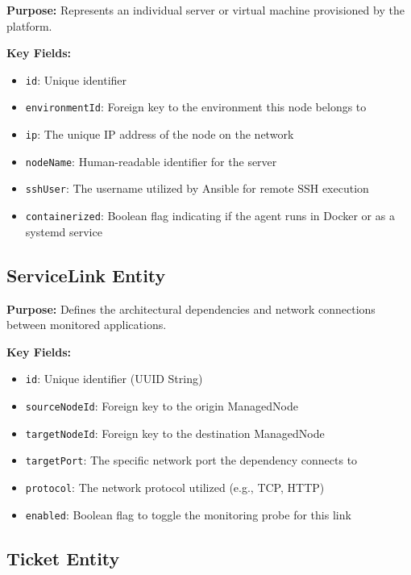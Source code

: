 \documentclass[12pt,a4paper]{report}
\begin{document}
\begin{tcolorbox}
  \textbf{Purpose:} Represents an individual server or virtual machine provisioned by the platform.
  
  \textbf{Key Fields:}
  \begin{itemize}
    \item \texttt{id}: Unique identifier
    \item \texttt{environmentId}: Foreign key to the environment this node belongs to
    \item \texttt{ip}: The unique IP address of the node on the network
    \item \texttt{nodeName}: Human-readable identifier for the server
    \item \texttt{sshUser}: The username utilized by Ansible for remote SSH execution
    \item \texttt{containerized}: Boolean flag indicating if the agent runs in Docker or as a systemd service
  \end{itemize}
\end{tcolorbox}

\subsection{ServiceLink Entity}

\begin{tcolorbox}
  \textbf{Purpose:} Defines the architectural dependencies and network connections between monitored applications.
  
  \textbf{Key Fields:}
  \begin{itemize}
    \item \texttt{id}: Unique identifier (UUID String)
    \item \texttt{sourceNodeId}: Foreign key to the origin ManagedNode
    \item \texttt{targetNodeId}: Foreign key to the destination ManagedNode
    \item \texttt{targetPort}: The specific network port the dependency connects to
    \item \texttt{protocol}: The network protocol utilized (e.g., TCP, HTTP)
    \item \texttt{enabled}: Boolean flag to toggle the monitoring probe for this link
  \end{itemize}
\end{tcolorbox}

\subsection{Ticket Entity}
\end{document}
